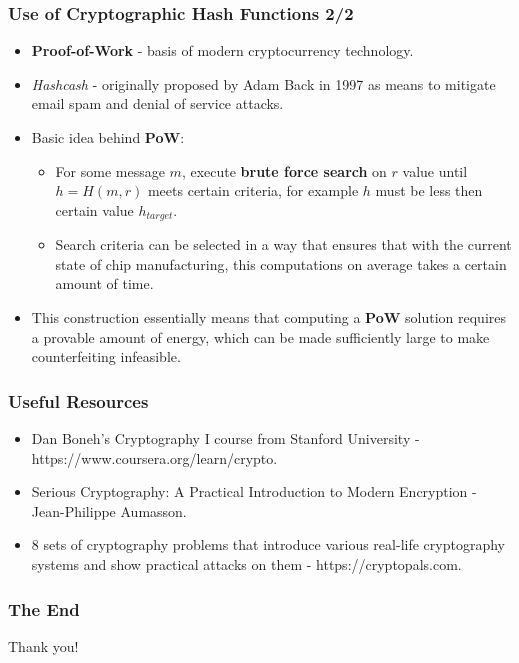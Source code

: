 \documentclass{beamer}
\begin{document}
\begin{frame}
  \frametitle{Use of Cryptographic Hash Functions 2/2}
  \begin{itemize}
  \item \textbf{Proof-of-Work} - basis of modern cryptocurrency technology.
  \item \textit{Hashcash} - originally proposed by Adam Back in 1997 as means to
    mitigate email spam and denial of service attacks.
  \item Basic idea behind \textbf{PoW}:
    \begin{itemize}
    \item For some message $m$, execute \textbf{brute force search} on $r$ value
      until $h = H(m, r)$ meets certain criteria, for example $h$ must be less
      then certain value $h_{target}$.
    \item Search criteria can be selected in a way that ensures that with the
      current state of chip manufacturing, this computations on average takes a
      certain amount of time.
    \end{itemize}
  \item This construction essentially means that computing a \textbf{PoW}
    solution requires a provable amount of energy, which can be made
    sufficiently large to make counterfeiting infeasible.
  \end{itemize}
\end{frame}

\begin{frame}
  \frametitle{Useful Resources}
  \begin{itemize}
  \item Dan Boneh's Cryptography I course from Stanford University -
    https://www.coursera.org/learn/crypto.
  \item Serious Cryptography: A Practical Introduction to Modern Encryption -
    Jean-Philippe Aumasson.
  \item 8 sets of cryptography problems that introduce various real-life
    cryptography systems and show practical attacks on them -
    https://cryptopals.com.
  \end{itemize}
\end{frame}

\begin{frame}
  \frametitle{The End}
  \begin{center}
    Thank you!
  \end{center}
\end{frame}
\end{document}
